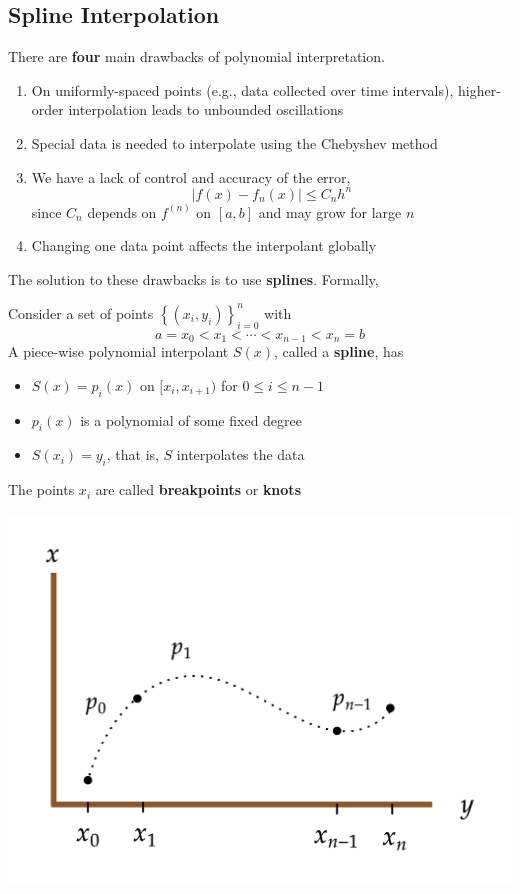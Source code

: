 \subsection{Spline Interpolation}
There are \textbf{four} main drawbacks of polynomial interpretation.
\begin{enumerate}
    \item On uniformly-spaced points (e.g., data collected over time intervals), higher-order interpolation leads to unbounded oscillations
    \item Special data is needed to interpolate using the Chebyshev method
    \item We have a lack of control and accuracy of the error,
    \[\left|f(x)-f_n(x)\right| \leq C_n h^n\]
    since $C_n$ depends on $f^{(n)}$ on $[a, b]$ and may grow for large $n$
    \item Changing one data point affects the interpolant globally
\end{enumerate}
The solution to these drawbacks is to use \textbf{splines}. Formally,
\begin{defn}[Spline]
    Consider a set of points $\left\{\left(x_i, y_i\right)\right\}_{i=0}^n$ with
    \[a=x_0<x_1<\cdots<x_{n-1}<x_n=b\]
    A piece-wise polynomial interpolant $S(x)$, called a \textbf{spline}, has
    \begin{itemize}
        \item $S(x) = p_i(x)$ on $[x_i, x_{i+1})$ for $0 \leq i \leq n - 1$
        \item $p_i(x)$ is a polynomial of some fixed degree
        \item $S\left(x_i\right)=y_i$, that is, $S$ interpolates the data
    \end{itemize}
    The points $x_i$ are called \textbf{breakpoints} or \textbf{knots}
\end{defn}

\begin{marginfigure}
    \begin{center}
           \includegraphics[width=\textwidth]{figures/fig-6.png}
    \end{center}
\end{marginfigure}


